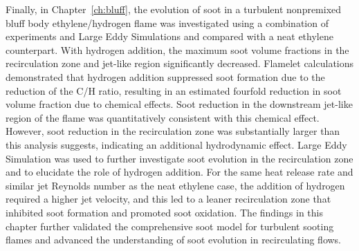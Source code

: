 {Finally, in Chapter~\ref{ch:bluff}, the evolution of soot in a turbulent nonpremixed bluff body ethylene/hydrogen flame was investigated using a combination of experiments and Large Eddy Simulations and compared with a neat ethylene counterpart.  With hydrogen addition, the maximum soot volume fractions in the recirculation zone and jet-like region significantly decreased.  Flamelet calculations demonstrated that hydrogen addition suppressed soot formation due to the reduction of the C/H ratio, resulting in an estimated fourfold reduction in soot volume fraction due to chemical effects.  Soot reduction in the downstream jet-like region of the flame was quantitatively consistent with this chemical effect.  However, soot reduction in the recirculation zone was substantially larger than this analysis suggests, indicating an additional hydrodynamic effect.  Large Eddy Simulation was used to further investigate soot evolution in the recirculation zone and to elucidate the role of hydrogen addition.  For the same heat release rate and similar jet Reynolds number as the neat ethylene case, the addition of hydrogen required a higher jet velocity, and this led to a leaner recirculation zone that inhibited soot formation and promoted soot oxidation.  The findings in this chapter further validated the comprehensive soot model for turbulent sooting flames and advanced the understanding of soot evolution in recirculating flows.} 

